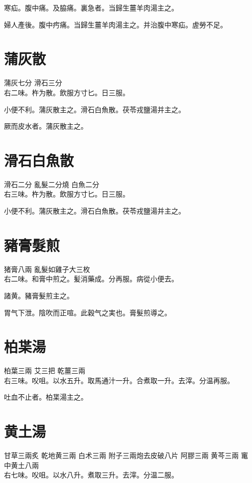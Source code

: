 寒疝。腹中痛。及脇痛。裏急者。当歸生薑羊肉湯主之。

婦人產後。腹中㽲痛。当歸生薑羊肉湯主之。并治腹中寒疝。虗勞不足。

\section{蒲灰散}

蒲灰{\scriptsize 七分} 滑石{\scriptsize 三分}\\
右二味。杵为散。飲服方寸匕。日三服。

小便不利。蒲灰散主之。滑石白魚散。茯苓戎鹽湯并主之。

厥而皮水者。蒲灰散主之。

\section{滑石白魚散}

滑石{\scriptsize 二分} 亂髮{\scriptsize 二分燒} 白魚{\scriptsize 二分}\\
右三味。杵为散。飲服方寸匕。日三服。

小便不利。蒲灰散主之。滑石白魚散。茯苓戎鹽湯并主之。

\section{豬膏髮煎}

猪膏{\scriptsize 八兩} 亂髮{\scriptsize 如雞子大三枚}\\
右二味。和膏中煎之。髪消藥成。分再服。病從小便去。

諸黄。豬膏髮煎主之。

胃气下泄。陰吹而正喧。此穀气之実也。膏髮煎導之。

\section{柏枼湯}

柏葉{\scriptsize 三兩} 艾{\scriptsize 三把} 乾薑{\scriptsize 三兩}\\
右三味。㕮咀。以水五升。取馬通汁一升。合煮取一升。去滓。分温再服。

吐血不止者。柏枼湯主之。

\section{黄土湯}

甘草{\scriptsize 三兩炙} 乾地黄{\scriptsize 三兩} 白术{\scriptsize 三兩} 附子{\scriptsize 三兩炮去皮破八片} 阿膠{\scriptsize 三兩} 黄芩{\scriptsize 三兩} 竃中黄土{\scriptsize 八兩}\\
右七味。㕮咀。以水八升。煮取三升。去滓。分温二服。

